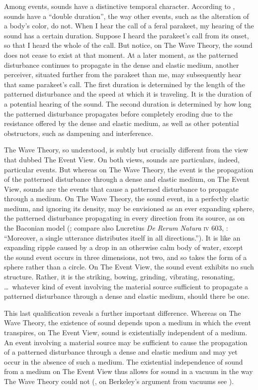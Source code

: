 Among events, sounds have a distinctive temporal character. According to \citet{OShaughnessy:2009aa}, sounds have a ``double duration'', the way other events, such as the alteration of a body's color, do not. When I hear the call of a feral parakeet, my hearing of the sound has a certain duration. Suppose I heard the parakeet's call from its onset, so that I heard the whole of the call. But notice, on The Wave Theory, the sound does not cease to exist at that moment. At a later moment, as the patterned disturbance continues to propagate in the dense and elastic medium, another perceiver, situated further from the parakeet than me, may subsequently hear that same parakeet's call. The first duration is determined by the length of the patterned disturbance and the speed at which it is traveling. It is the duration of a potential hearing of the sound. The second duration is determined by how long the patterned disturbance propagates before completely eroding due to the resistance offered by the dense and elastic medium, as well as other potential obstructors, such as dampening and interference.

The Wave Theory, so understood, is subtly but crucially different from the view that \citet{OCallaghan:2007xy} dubbed The Event View. On both views, sounds are particulars, indeed, particular events. But whereas on The Wave Theory, the event is the propagation of the patterned disturbance through a dense and elastic medium, on The Event View, sounds are the events that cause a patterned disturbance to propagate through a medium. On The Wave Theory, the sound event, in a perfectly elastic medium, and ignoring its density, may be envisioned as an ever expanding sphere, the patterned disturbance propagating in every direction from its source, as on the Baconian model (\citealt{Sorensen:2009aa}; compare also Lucretius \emph{De Rerum Natura} \textsc{iv} 603, \citealt{Smith:2001aa}: ``Moreover, a single utterance distributes itself in all directions.''). It is like an expanding ripple caused by a drop in an otherwise calm body of water, except the sound event occurs in three dimensions, not two, and so takes the form of a sphere rather than a circle. On The Event View, the sound event exhibits no such structure. Rather, it is the striking, bowing, grinding, vibrating, resonating, \ldots\ whatever kind of event involving the material source sufficient to propagate a patterned disturbance through a dense and elastic medium, should there be one. 

This last qualification reveals a further important difference. Whereas on The Wave Theory, the existence of sound depends upon a medium in which the event transpires, on The Event View, sound is existentially independent of a medium. An event involving a material source may be sufficient to cause the propagation of a patterned disturbance through a dense and elastic medium and may yet occur in the absence of such a medium. The existential independence of sound from a medium on The Event View thus allows for sound in a vacuum in the way The Wave Theory could not (\citealt{OCallaghan:2007xy,OCallaghan:2009aa}, on Berkeley's argument from vacuums see \citealt{Pasnau:1999ss}).

